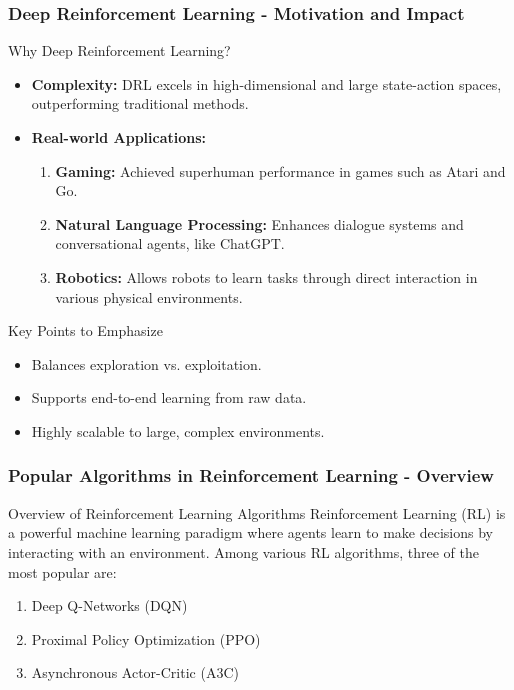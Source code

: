 \documentclass[aspectratio=169]{beamer}
\begin{document}
\begin{frame}[fragile]
    \frametitle{Deep Reinforcement Learning - Motivation and Impact}
    \begin{block}{Why Deep Reinforcement Learning?}
        \begin{itemize}
            \item \textbf{Complexity:} DRL excels in high-dimensional and large state-action spaces, outperforming traditional methods.
            \item \textbf{Real-world Applications:}
            \begin{enumerate}
                \item \textbf{Gaming:} Achieved superhuman performance in games such as Atari and Go.
                \item \textbf{Natural Language Processing:} Enhances dialogue systems and conversational agents, like ChatGPT.
                \item \textbf{Robotics:} Allows robots to learn tasks through direct interaction in various physical environments.
            \end{enumerate}
        \end{itemize}
    \end{block}
    
    \begin{block}{Key Points to Emphasize}
        \begin{itemize}
            \item Balances exploration vs. exploitation.
            \item Supports end-to-end learning from raw data.
            \item Highly scalable to large, complex environments.
        \end{itemize}
    \end{block}
\end{frame}

\begin{frame}[fragile]
    \frametitle{Popular Algorithms in Reinforcement Learning - Overview}
    \begin{block}{Overview of Reinforcement Learning Algorithms}
        Reinforcement Learning (RL) is a powerful machine learning paradigm where agents learn to make decisions by interacting with an environment. 
        Among various RL algorithms, three of the most popular are:
    \end{block}
    \begin{enumerate}
        \item Deep Q-Networks (DQN)
        \item Proximal Policy Optimization (PPO)
        \item Asynchronous Actor-Critic (A3C)
    \end{enumerate}
\end{frame}
\end{document}
